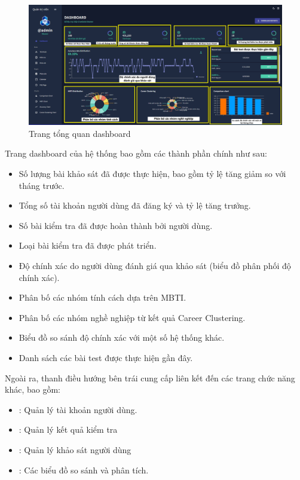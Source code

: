 \begin{figure}[H]
    \centering
    \includegraphics[width=0.9\linewidth]{images/dashboard.png}
    \vspace{0.6cm}
    \caption{Trang tổng quan dashboard}
\end{figure}

Trang dashboard của hệ thống bao gồm các thành phần chính như sau:
\begin{itemize}
    \item Số lượng bài khảo sát đã được thực hiện, bao gồm tỷ lệ tăng giảm so với tháng trước.
    \item Tổng số tài khoản người dùng đã đăng ký và tỷ lệ tăng trưởng.
    \item Số bài kiểm tra đã được hoàn thành bởi người dùng.
    \item Loại bài kiểm tra đã được phát triển.
    \item Độ chính xác do người dùng đánh giá qua khảo sát (biểu đồ phân phối độ chính xác).
    \item Phân bố các nhóm tính cách dựa trên MBTI.
    \item Phân bố các nhóm nghề nghiệp từ kết quả Career Clustering.
    \item Biểu đồ so sánh độ chính xác với một số hệ thống khác.
    \item Danh sách các bài test được thực hiện gần đây.
\end{itemize}

Ngoài ra, thanh điều hướng bên trái cung cấp liên kết đến các trang chức năng khác, bao gồm:
\begin{itemize}
    \item {}: Quản lý tài khoản người dùng.
    \item {}: Quản lý kết quả kiểm tra
    \item {}: Quản lý khảo sát người dùng
    \item {}: Các biểu đồ so sánh và phân tích.
\end{itemize}

